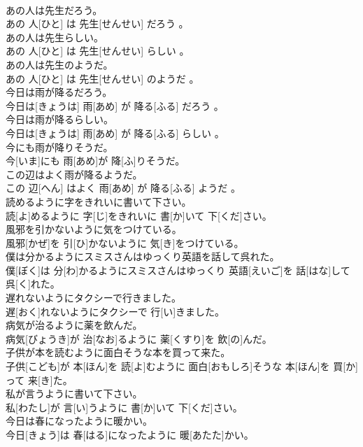 \documentclass[8pt]{extreport}
\begin{document}
\begin{CJK}{UTF8}{min}
\\	あの人は先生だろう。	
\\	あの 人[ひと] は 先生[せんせい] だろう 。
\\	あの人は先生らしい。	
\\	あの 人[ひと] は 先生[せんせい] らしい 。
\\	あの人は先生のようだ。	
\\	あの 人[ひと] は 先生[せんせい] のようだ 。
\\	今日は雨が降るだろう。	
\\	今日は[きょうは] 雨[あめ] が 降る[ふる] だろう 。
\\	今日は雨が降るらしい。	
\\	今日は[きょうは] 雨[あめ] が 降る[ふる] らしい 。
\\	今にも雨が降りそうだ。	
\\	今[いま]にも 雨[あめ]が 降[ふ]りそうだ。
\\	この辺はよく雨が降るようだ。	
\\	この 辺[へん] はよく 雨[あめ] が 降る[ふる] ようだ 。
\\	読めるように字をきれいに書いて下さい。	
\\	読[よ]めるように 字[じ]をきれいに 書[か]いて 下[くだ]さい。
\\	風邪を引かないように気をつけている。	
\\	風邪[かぜ]を 引[ひ]かないように 気[き]をつけている。
\\	僕は分かるようにスミスさんはゆっくり英語を話して呉れた。	
\\	僕[ぼく]は 分[わ]かるようにスミスさんはゆっくり 英語[えいご]を 話[はな]して 呉[く]れた。
\\	遅れないようにタクシーで行きました。	
\\	遅[おく]れないようにタクシーで 行[い]きました。
\\	病気が治るように薬を飲んだ。	
\\	病気[びょうき]が 治[なお]るように 薬[くすり]を 飲[の]んだ。
\\	子供が本を読むように面白そうな本を買って来た。	
\\	子供[こども]が 本[ほん]を 読[よ]むように 面白[おもしろ]そうな 本[ほん]を 買[か]って 来[き]た。
\\	私が言うように書いて下さい。	
\\	私[わたし]が 言[い]うように 書[か]いて 下[くだ]さい。
\\	今日は春になったように暖かい。	
\\	今日[きょう]は 春[はる]になったように 暖[あたた]かい。

\end{CJK}
\end{document}
